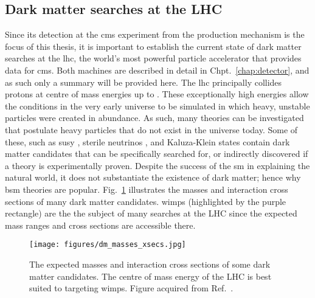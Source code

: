 

\subsection{Dark matter searches at the LHC}
\label{subsec:dm_searches_lhc}

Since its detection at the \acrshort{cms} experiment from the production mechanism is the focus of this thesis, it is important to establish the current state of dark matter searches at the \acrfull{lhc}, the world's most powerful particle accelerator that provides data for \acrshort{cms}. Both machines are described in detail in Chpt.~\ref{chap:detector}, and as such only a summary will be provided here. The \acrshort{lhc} principally collides protons at centre of mass energies up to \comruntwo. These exceptionally high energies allow the conditions in the very early universe to be simulated in which heavy, unstable particles were created in abundance. As such, many theories can be investigated that postulate heavy particles that do not exist in the universe today. Some of these, such as \acrfull{susy} \cite{Martin:1997ns}, sterile neutrinos \cite{doi:10.1142/S0218301313300191}, and Kaluza-Klein states \cite{Han:1998sg} contain dark matter candidates that can be specifically searched for, or indirectly discovered if a theory is experimentally proven. Despite the success of the \acrlong{sm} in explaining the natural world, it does not substantiate the existence of dark matter; hence why \acrshort{bsm} theories are popular. Fig.~\ref{fig:dm_masses_xsecs} illustrates the masses and interaction cross sections of many dark matter candidates. \Glspl{wimp} (highlighted by the purple rectangle) are the the subject of many searches at the LHC since the expected mass ranges and cross sections are accessible there.

\begin{figure}[htbp]
    \centering
    \texttt{[image: figures/dm\_masses\_xsecs.jpg]}
    \caption[The expected masses and interaction cross sections of some dark matter candidates. The centre of mass energy of the LHC is best suited to targeting WIMPs]{The expected masses and interaction cross sections of some dark matter candidates. The centre of mass energy of the LHC is best suited to targeting \glspl{wimp}. Figure acquired from Ref.~.}
    \label{fig:dm_masses_xsecs}
\end{figure}

